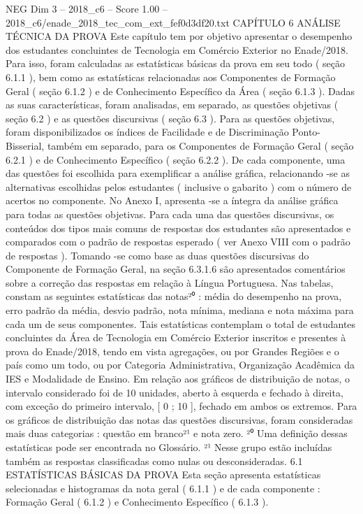 \begin{textsample}{NEG Dim 3 – 2018\_c6 – Score 1.00 – 2018\_c6/enade\_2018\_tec\_com\_ext\_fef0d3df20.txt}  \label{ex:f3_neg_168}
CAPÍTULO 6 ANÁLISE TÉCNICA DA PROVA Este capítulo tem por objetivo apresentar o desempenho dos estudantes concluintes de Tecnologia em Comércio Exterior no Enade/2018.
Para isso, foram calculadas as estatísticas básicas da prova em seu todo ( seção 6.1.1 ), bem como as estatísticas relacionadas aos Componentes de Formação Geral ( seção 6.1.2 ) e de Conhecimento Específico da Área ( seção 6.1.3 ).
Dadas as suas características, foram analisadas, em separado, as questões objetivas ( seção 6.2 ) e as questões discursivas ( seção 6.3 ).
Para as questões objetivas, foram disponibilizados os índices de Facilidade e de Discriminação Ponto-Bisserial, também em separado, para os Componentes de Formação Geral ( seção 6.2.1 ) e de Conhecimento Específico ( seção 6.2.2 ).
De cada componente, uma das questões foi escolhida para exemplificar a análise gráfica, relacionando -se as alternativas escolhidas pelos estudantes ( inclusive o gabarito ) com o número de acertos no componente.
No Anexo I, apresenta -se a íntegra da análise gráfica para todas as questões objetivas.
Para cada uma das questões discursivas, os conteúdos dos tipos mais comuns de respostas dos estudantes são apresentados e comparados com o padrão de respostas esperado ( ver Anexo VIII com o padrão de respostas ).
Tomando -se como base as duas questões discursivas do Componente de Formação Geral, na seção 6.3.1.6 são apresentados comentários sobre a correção das respostas em relação à Língua Portuguesa.
Nas tabelas, constam as seguintes estatísticas das notas²⁰ : média do desempenho na prova, erro padrão da média, desvio padrão, nota mínima, mediana e nota máxima para cada um de seus componentes.
Tais estatísticas contemplam o total de estudantes concluintes da Área de Tecnologia em Comércio Exterior inscritos e presentes à prova do Enade/2018, tendo em vista agregações, ou por Grandes Regiões e o país como um todo, ou por Categoria Administrativa, Organização Acadêmica da IES e Modalidade de Ensino.
Em relação aos gráficos de distribuição de notas, o intervalo considerado foi de 10 unidades, aberto à esquerda e fechado à direita, com exceção do primeiro intervalo, [ 0 ; 10 ], fechado em ambos os extremos.
Para os gráficos de distribuição das notas das questões discursivas, foram consideradas mais duas categorias : questão em branco²¹ e nota zero. ²⁰ Uma definição dessas estatísticas pode ser encontrada no Glossário. ²¹ Nesse grupo estão incluídas também as respostas classificadas como nulas ou desconsideradas. 6.1 ESTATÍSTICAS BÁSICAS DA PROVA Esta seção apresenta estatísticas selecionadas e histogramas da nota geral ( 6.1.1 ) e de cada componente : Formação Geral ( 6.1.2 ) e Conhecimento Específico ( 6.1.3 ).

\end{textsample}
